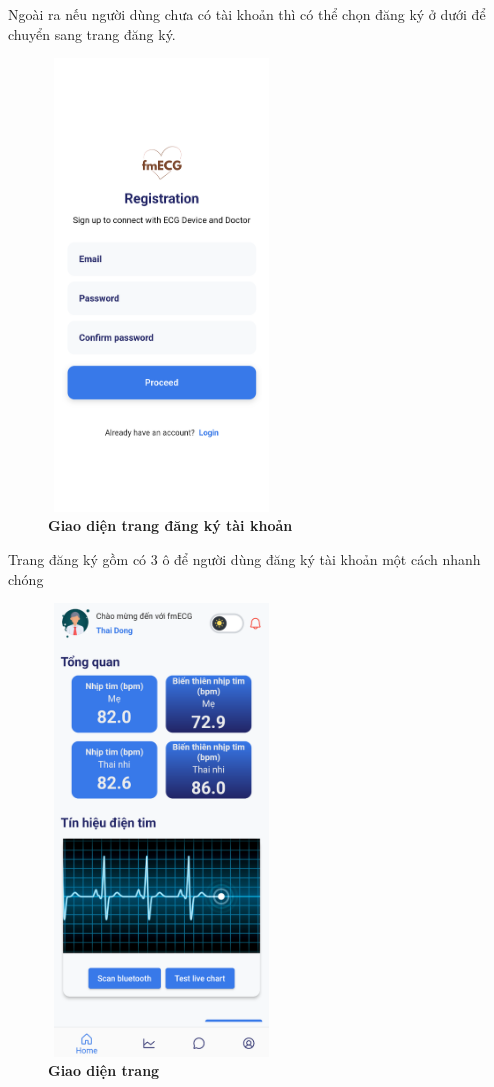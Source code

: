 Ngoài ra nếu người dùng chưa có tài khoản thì có thể chọn đăng ký ở dưới để chuyển sang trang đăng ký.

\begin{figure}[H]
  \centering
  \includegraphics[width=6cm,height=12cm]{Images/mobile_app/demo/register.png}
  \caption[Giao diện trang đăng ký tài khoản]{\bfseries \fontsize{12pt}{0pt}\selectfont Giao diện trang đăng ký tài khoản}
  \label{demo_register} %
\end{figure}

Trang đăng ký gồm có 3 ô để người dùng đăng ký tài khoản một cách nhanh chóng

\begin{figure}[H]
  \centering
  \includegraphics[width=6cm,height=12cm]{Images/mobile_app/demo/home_screen.png}
  \caption[Giao diện trang]{\bfseries \fontsize{12pt}{0pt}\selectfont Giao diện trang}
  \label{demo_} %
\end{figure}

